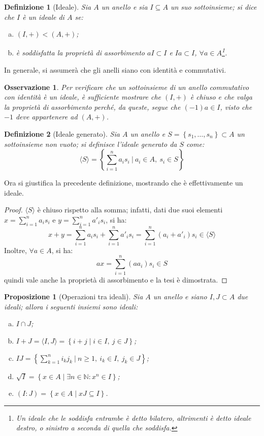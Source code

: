 \documentclass[12pt]{scrartcl}
\theoremstyle{style}
\newtheorem{definizione}{Definizione}[section]
\newtheorem{prop}{Proposizione}[section]
\newtheorem{osservazione}{Osservazione}[section]
\newenvironment{boxenv}[1][]{
    \begin{eqbox}[#1]
    }{
   \end{eqbox}
}
\numberwithin{equation}{subsection}
\begin{document}
\begin{definizione}
	[Ideale]
	Sia $A $ un anello e sia $I \subseteq A$ un suo sottoinsieme; si dice che $I$ \`e un ideale di $A$ se:
	\begin{enumerate}[(a).]
		\item $(I,+) < (A,+)$;
		\item \`e soddisfatta la propriet\`a di assorbimento $aI \subset I$ e $Ia \subset I$, $\forall a \in A$\footnote{Un ideale che le soddisfa entrambe \`e detto \textit{bilatero}, altrimenti \`e detto \textit{ideale destro}, o \textit{sinistro} a seconda di quella che soddisfa.}.
	\end{enumerate}
\end{definizione}
\begin{boxenv}[]
\centering	In generale, si assumer\`a che gli anelli siano con identit\`a e commutativi.
\end{boxenv}
\begin{osservazione}
Per verificare che un sottoinsieme di un anello commutativo con identit\`a \`e un ideale, \`e sufficiente mostrare che $(I,+)$ \`e chiuso e che valga la propriet\`a di assorbimento perch\'e, da queste, segue che $(-1)a \in I$, visto che $-1$ deve appartenere ad $(A,+)$.
\end{osservazione}
\begin{definizione}
	[Ideale generato]
	Sia $A$ un anello e $S=\left\{ s_1,\ldots,s_n \right\}  \subset A$ un sottoinsieme non vuoto; si definisce l'\textit{ideale generato} da $S$ come:
	\[
	\langle S \rangle= \left\{ \sum_{i=1}^{n} a_i s_i  \ \Bigg\lvert\ a_i \in A, \ s_i \in S \right\} 
	\] 
\end{definizione}
\noindent Ora si giustifica la precedente definizione, mostrando che \`e effettivamente un ideale.
\begin{proof}
	$\langle S \rangle$ \`e chiuso rispetto alla somma; infatti, dati due suoi elementi $x = \sum_{i=1}^{n} a_i s_i$ e $ y = \sum_{i=1}^{n} a'_i s_i$, si ha:
\[
x+y = \sum_{i=1}^{n} a_is_i + \sum_{i=1}^{n} a'_i s_i = \sum_{i=1}^{n} (a_i + a'_i) s_i \in \langle S \rangle
\] 
Inoltre, $\forall a \in A$, si ha:
\[
ax = \sum_{i=1}^{n}( a a_i) s_i \in S
\] 
quindi vale anche la propriet\`a di assorbimento e la tesi \`e dimostrata.
\end{proof}
\begin{prop}
	[Operazioni tra ideali]
	Sia $A$ un anello e siano $I,J \subset A$ due ideali; allora i seguenti insiemi sono ideali:
	\begin{enumerate}[(a).]
		\item $I\cap J$;
		\item $I+J = \langle I,J \rangle = \left\{ i + j  \mid i \in I, \ j \in J \right\} $;
		\item $IJ = \left\{ \sum_{k=1}^{n} i_k j_k\ \Big\lvert\ n\ge 1,\ i_k \in I, \ j_k \in J \right\} $;
		\item $\sqrt{I} = \left\{ x \in A  \mid \exists n \in \mathbb{N} : x^n \in I \right\} $;
		\item $(I:J) = \left\{ x \in A  \mid  xJ \subseteq I \right\} $.
	\end{enumerate}
\end{prop}
\end{document}

